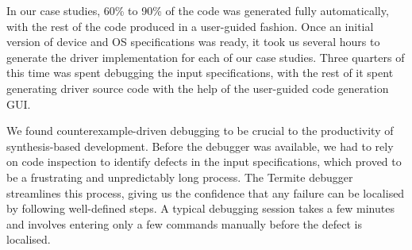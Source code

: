 \documentclass{book}
\newcommand{\termite}{Termite\xspace}
\theoremstyle{definition}
\begin{document}
In our case studies, 60\% to 90\% of the code was generated fully automatically, with the rest of the code produced in a user-guided fashion.  Once an initial version of device and OS specifications was ready, it took us several hours to generate the driver implementation for each of our case studies.  Three quarters of this time was spent debugging the input specifications, with the rest of it spent generating driver source code with the help of the user-guided code generation GUI.

We found counterexample-driven debugging to be crucial to the productivity of synthesis-based development.  Before the debugger was available, we had to rely on code inspection to identify defects in the input specifications, which proved to be a frustrating and unpredictably long process.  The \termite debugger streamlines this process, giving us the confidence that any failure can be localised by following well-defined steps.  A typical debugging session takes a few minutes and involves entering only a few commands manually before the defect is localised. 

%
%
%

\end{document}
